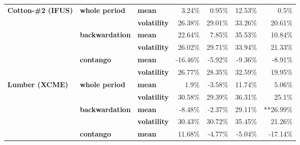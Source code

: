 \documentclass[
  authoryear,
  preprint,
  3p]{elsarticle}
\begin{document}
\begin{longtable}[t]{>{}l>{}l>{}l>{}r>{}r>{}r>{}r}
\textbf{Cotton-\#2 (IFUS)} & \textbf{whole period} & \textbf{mean} & \textcolor[HTML]{4285f4}{3.24\%} & \textcolor[HTML]{4285f4}{0.95\%} & \textcolor[HTML]{4285f4}{12.53\%} & \textcolor[HTML]{4285f4}{0.5\%}\\
\textbf{} & \textbf{} & \textbf{volatility} & \textcolor[HTML]{4285f4}{26.38\%} & \textcolor[HTML]{4285f4}{29.01\%} & \textcolor[HTML]{4285f4}{33.26\%} & \textcolor[HTML]{4285f4}{20.61\%}\\
\textbf{} & \textbf{backwardation} & \textbf{mean} & \textcolor[HTML]{4285f4}{22.64\%} & \textcolor[HTML]{4285f4}{7.85\%} & \textcolor[HTML]{4285f4}{35.53\%} & \textcolor[HTML]{4285f4}{10.84\%}\\
\textbf{} & \textbf{} & \textbf{volatility} & \textcolor[HTML]{4285f4}{26.02\%} & \textcolor[HTML]{4285f4}{29.71\%} & \textcolor[HTML]{4285f4}{33.94\%} & \textcolor[HTML]{4285f4}{21.33\%}\\
\addlinespace
\textbf{} & \textbf{contango} & \textbf{mean} & \textcolor[HTML]{4285f4}{-16.46\%} & \textcolor[HTML]{4285f4}{-5.92\%} & \textcolor[HTML]{4285f4}{-9.36\%} & \textcolor[HTML]{4285f4}{-8.91\%}\\
\textbf{} & \textbf{} & \textbf{volatility} & \textcolor[HTML]{4285f4}{26.77\%} & \textcolor[HTML]{4285f4}{28.35\%} & \textcolor[HTML]{4285f4}{32.59\%} & \textcolor[HTML]{4285f4}{19.95\%}\\
\textbf{Lumber (XCME)} & \textbf{whole period} & \textbf{mean} & \textcolor[HTML]{4285f4}{1.9\%} & \textcolor[HTML]{4285f4}{-3.58\%} & \textcolor[HTML]{4285f4}{11.74\%} & \textcolor[HTML]{4285f4}{5.06\%}\\
\textbf{} & \textbf{} & \textbf{volatility} & \textcolor[HTML]{4285f4}{30.58\%} & \textcolor[HTML]{4285f4}{29.39\%} & \textcolor[HTML]{4285f4}{36.31\%} & \textcolor[HTML]{4285f4}{25.1\%}\\
\textbf{} & \textbf{backwardation} & \textbf{mean} & \textcolor[HTML]{4285f4}{-8.48\%} & \textcolor[HTML]{4285f4}{-2.37\%} & \textcolor[HTML]{4285f4}{29.11\%} & \textcolor[HTML]{4285f4}{**26.99\%}\\
\addlinespace
\textbf{} & \textbf{} & \textbf{volatility} & \textcolor[HTML]{4285f4}{30.43\%} & \textcolor[HTML]{4285f4}{30.72\%} & \textcolor[HTML]{4285f4}{35.45\%} & \textcolor[HTML]{4285f4}{21.26\%}\\
\textbf{} & \textbf{contango} & \textbf{mean} & \textcolor[HTML]{4285f4}{11.68\%} & \textcolor[HTML]{4285f4}{-4.77\%} & \textcolor[HTML]{4285f4}{-5.04\%} & \textcolor[HTML]{4285f4}{-17.14\%}\\

\end{longtable}
\end{document}
